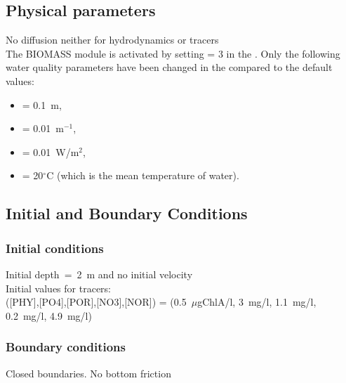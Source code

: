 \subsection{Physical parameters}
%
No diffusion neither for hydrodynamics or tracers\\
%
The BIOMASS module is activated by setting  = 3
in the  .
%
Only the following water quality parameters have been changed
in the \waqtel {} compared to the default values:
\begin{itemize}
\item {} = 0.1~m,
\item {} = 0.01~m$^{-1}$,
\item {} = 0.01~W/m$^2$,
\item {} = 20$^\circ$C (which is the mean temperature of water).
\end{itemize}
%
%
%
%
%
%
\subsection{Initial and Boundary Conditions}
%
\subsubsection{Initial conditions}
%
Initial depth~=~2~m
and no initial velocity\\
Initial values for tracers:\\
([PHY],[PO4],[POR],[NO3],[NOR]) =
(0.5~$\mu$gChlA/l, 3~mg/l, 1.1~mg/l, 0.2~mg/l, 4.9~mg/l)
%
\subsubsection{Boundary conditions}
%
Closed boundaries. No bottom friction
%
